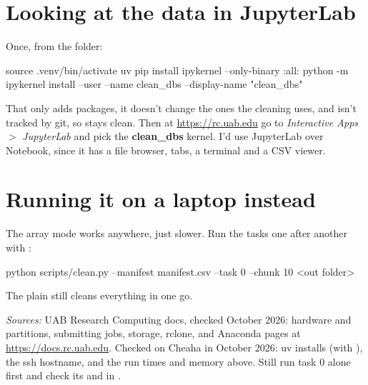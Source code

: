 \section{Looking at the data in JupyterLab}
Once, from the  folder:
\begin{codebox}
source .venv/bin/activate
uv pip install ipykernel --only-binary :all:
python -m ipykernel install --user --name clean_dbs --display-name "clean_dbs"
\end{codebox}
That only adds packages, it doesn't change the ones the cleaning uses, and  isn't tracked by git, so  stays clean. Then at \url{https://rc.uab.edu} go to \textit{Interactive Apps} $>$ \textit{JupyterLab} and pick the \textbf{clean\_dbs} kernel. I'd use JupyterLab over Notebook, since it has a file browser, tabs, a terminal and a CSV viewer.

\section{Running it on a laptop instead}
The array mode works anywhere, just slower. Run the tasks one after another with :
\begin{codebox}
python scripts/clean.py --manifest manifest.csv --task 0 --chunk 10 <out folder>
\end{codebox}
The plain  still cleans everything in one go.

\vspace{1em}
{\small\textit{Sources:} UAB Research Computing docs, checked October 2026: hardware and partitions, submitting jobs, storage, rclone, and Anaconda pages at \url{https://docs.rc.uab.edu}. Checked on Cheaha in October 2026: uv installs (with ), the ssh hostname, and the run times and memory above. Still run task 0 alone first and check its  and  in .\par}


